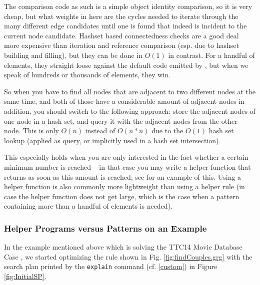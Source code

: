 The comparison code as such is a simple object identity comparison, so it is very cheap, 
but what weights in here are the cycles needed to iterate through the many different edge candidates until one is found that indeed is incident to the current node candidate.
Hashset based connectedness checks are a good deal more expensive than iteration and reference comparison (esp. due to hashset building and filling), but they can be done in $O(1)$ in contrast.
For a handful of elements, they straight loose against the default code emitted by \GrG, but when we speak of hundreds or thousands of elements, they win.

So when you have to find all nodes that are adjacent to two different nodes at the same time, 
and both of those have a considerable amount of adjacent nodes in addition,
you should switch to the following approach:
store the adjacent nodes of one node in a hash set, and query it with the adjacent nodes from the other node.
This is only $O(n)$ instead of $O(n*n)$ due to the $O(1)$ hash set lookup (applied as query, or implicitly used in a hash set intersection).

This especially holds when you are only interested in the fact whether a certain minimum number is reached -- in that case you may write a helper function that returns as soon as this amount is reached; see \cite{MovieDatabase} for an example of this.
Using a helper function is also commonly more lightweight than using a helper rule (in case the helper function does not get large, which is the case when a pattern containing more than a handful of elements is needed).

\subsubsection*{Helper Programs versus Patterns on an Example}

In the example \cite{MovieDatabase} mentioned above which is solving the TTC14 Movie Database Case \cite{MovieDatabaseCase}, we started optimizing the rule shown in Fig. \ref{fig:findCouples.grg}
with the search plan printed by the \texttt{explain} command (cf. \ref{custom}) in Figure \ref{fig:InitialSP}.

